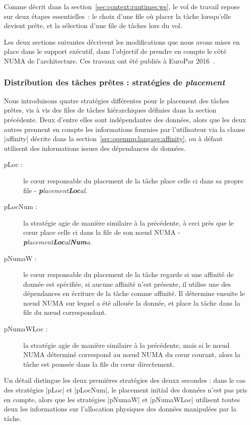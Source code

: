 Comme décrit dans la section~\ref{sec:context:runtimes:ws}, le vol de travail repose sur deux étapes essentielles~: le choix d'une file où placer la tâche lorsqu'elle devient prête, et la sélection d'une file de tâches lors du vol.

Les deux sections suivantes décrivent les modifications que nous avons mises en place dans le support exécutif, dans l'objectif de prendre en compte le côté NUMA de l'architecture.
Ces travaux ont été publiés à EuroPar 2016~\cite{Virouleau2016b}.


\subsubsection{Distribution des tâches prêtes : stratégies de \emph{placement}}
\label{sec:openmp:runtime:push}

Nous introduisons quatre stratégies différentes pour le placement des tâches prêtes, vis à vis des files de tâches hiérarchiques définies dans la section précédente.
Deux d'entre elles sont indépendantes des données, alors que les deux autres prennent en compte les informations fournies par l'utilisateur via la clause |affinity| décrite dans la section~\ref{sec:openmp:langage:affinity}, ou à défaut utilisent des informations issues des dépendances de données.

\begin{description}
  \item [pLoc :] le cœur responsable du placement de la tâche place celle ci dans sa propre file - \emph{\textbf{p}lacement\textbf{Loc}al}.
  \item [pLocNum :] la stratégie agie de manière similaire à la précédente, à ceci près que le cœur place celle ci dans la file de son nœud NUMA - \emph{\textbf{p}lacement\textbf{Loc}al\textbf{Num}a}.
  \item [pNumaW :] le cœur responsable du placement de la tâche regarde si une affinité de donnée est spécifiée, si aucune affinité n'est présente, il utilise une des dépendances en écriture de la tâche comme affinité.
Il détermine ensuite le nœud NUMA sur lequel a été allouée la donnée, et place la tâche dans la file du nœud correspondant.
  \item [pNumaWLoc :] la stratégie agie de manière similaire à la précédente, mais si le nœud NUMA déterminé correspond au nœud NUMA du cœur courant, alors la tâche est poussée dans la file du cœur directement.
\end{description}

Un détail distingue les deux premières stratégies des deuxx secondes : dans le cas des stratégies |pLoc| et |pLocNum|, le placement initial des données n'est pas pris en compte, alors que les stratégies |pNumaW| et |pNumaWLoc| utilisent toutes deux les informations sur l'allocation physiques des données manipulées par la tâche.

